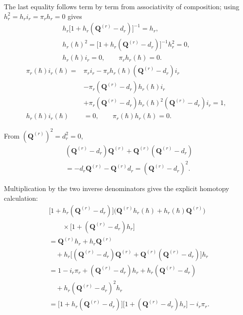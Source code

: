 \documentclass[11pt]{article}
\numberwithin{equation}{section}
\numberwithin{figure}{section}
\numberwithin{table}{section}
\begin{document}
\begin{proofbox}
The last equality follows term by term from associativity of composition; using $h_r^2=h_ri_r=\pi_rh_r=0$ gives
\begin{equation}\label{eq-ch8-transfer-side-conditions}
\begin{gathered}
h_r\bigl[1+h_r(\mathbf Q^{(r)}-d_r)\bigr]^{-1}=h_r,\\
h_r(\hbar)^2
=\bigl[1+h_r(\mathbf Q^{(r)}-d_r)\bigr]^{-1}h_r^2=0,\\
h_r(\hbar)i_r=0,\qquad \pi_rh_r(\hbar)=0.
\end{gathered}
\end{equation}
\begin{equation}\label{eq-ch8-transfer-retraction-proof}
\begin{aligned}
\pi_r(\hbar)i_r(\hbar)
={}&\pi_ri_r-\pi_rh_r(\hbar)(\mathbf Q^{(r)}-d_r)i_r\\
&-\pi_r(\mathbf Q^{(r)}-d_r)h_r(\hbar)i_r\\
&+\pi_r(\mathbf Q^{(r)}-d_r)h_r(\hbar)^2(\mathbf Q^{(r)}-d_r)i_r=1,\\
h_r(\hbar)i_r(\hbar)&=0,\qquad
\pi_r(\hbar)h_r(\hbar)=0.
\end{aligned}
\end{equation}

From $(\mathbf Q^{(r)})^2=d_r^2=0$,
\begin{equation}\label{eq-ch8-transfer-perturbation-algebra}
\begin{aligned}
&(\mathbf Q^{(r)}-d_r)\mathbf Q^{(r)}
+\mathbf Q^{(r)}(\mathbf Q^{(r)}-d_r)\\
&=-d_r\mathbf Q^{(r)}-\mathbf Q^{(r)}d_r
=(\mathbf Q^{(r)}-d_r)^2.
\end{aligned}
\end{equation}

Multiplication by the two inverse denominators gives the explicit homotopy calculation:
\begin{equation}\label{eq-ch8-transfer-homotopy-calculation}
\begin{aligned}
&\bigl[1+h_r(\mathbf Q^{(r)}-d_r)\bigr]
\bigl(\mathbf Q^{(r)}h_r(\hbar)+h_r(\hbar)\mathbf Q^{(r)}\bigr)\\
&\qquad\times\bigl[1+(\mathbf Q^{(r)}-d_r)h_r\bigr]\\
&=\mathbf Q^{(r)}h_r+h_r\mathbf Q^{(r)}\\
&\quad+h_r\bigl[(\mathbf Q^{(r)}-d_r)\mathbf Q^{(r)}
+\mathbf Q^{(r)}(\mathbf Q^{(r)}-d_r)\bigr]h_r\\
&=1-i_r\pi_r+(\mathbf Q^{(r)}-d_r)h_r
+h_r(\mathbf Q^{(r)}-d_r)\\
&\quad+h_r(\mathbf Q^{(r)}-d_r)^2h_r\\
&=\bigl[1+h_r(\mathbf Q^{(r)}-d_r)\bigr]
\bigl[1+(\mathbf Q^{(r)}-d_r)h_r\bigr]-i_r\pi_r.
\end{aligned}
\end{equation}


\end{proofbox}
\end{document}
